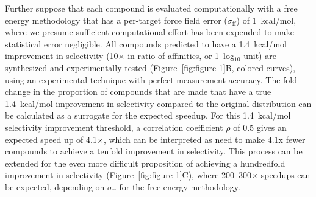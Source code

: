 \documentclass[phd,tocprelim]{cornell}
\begin{document}
Further suppose that each compound is evaluated computationally with a free energy methodology that has a per-target force field error ($\sigma_\text{ff}$) of 1~kcal/mol, where we presume sufficient computational effort has been expended to make statistical error negligible. 
All compounds predicted to have a 1.4~kcal/mol improvement in selectivity (10$\times$ in ratio of affinities, or 1~log$_{10}$ unit) are synthesized and experimentally tested (Figure~\ref{fig:figure-1}B, colored curves), using an experimental technique with perfect measurement accuracy. 
The fold-change in the proportion of compounds that are made that have a true 1.4~kcal/mol improvement in selectivity compared to the original distribution can be calculated as a surrogate for the expected speedup. 
For this 1.4~kcal/mol selectivity improvement threshold, a correlation coefficient $\rho$ of 0.5 gives an expected speed up of 4.1$\times$, which can be interpreted as need to make 4.1x fewer compounds to achieve a tenfold improvement in selectivity. 
This process can be extended for the even more difficult proposition of achieving a hundredfold improvement in selectivity (Figure~\ref{fig:figure-1}C), where 200--300$\times$ speedups can be expected, depending on $\sigma_\text{ff}$ for the free energy methodology. 
\end{document}

